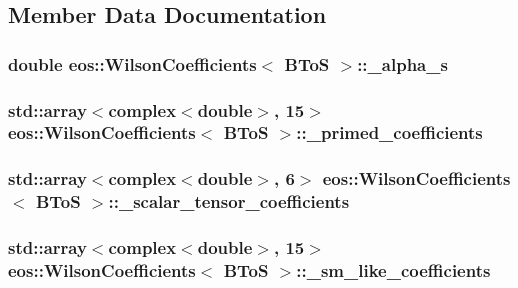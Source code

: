 \subsection{Member Data Documentation}
\hypertarget{structeos_1_1WilsonCoefficients_3_01BToS_01_4_ad988c930213682048f50ec4fa3390cc8}{
\subsubsection[{\_\-alpha\_\-s}]{\setlength{\rightskip}{0pt plus 5cm}double eos::WilsonCoefficients$<$ {\bf BToS} $>$::{\bf \_\-alpha\_\-s}}}
\label{structeos_1_1WilsonCoefficients_3_01BToS_01_4_ad988c930213682048f50ec4fa3390cc8}
\hypertarget{structeos_1_1WilsonCoefficients_3_01BToS_01_4_a4c2aa2cde65c6c77df70e6fa87736ac7}{
\subsubsection[{\_\-primed\_\-coefficients}]{\setlength{\rightskip}{0pt plus 5cm}std::array$<$complex$<$double$>$, 15$>$ eos::WilsonCoefficients$<$ {\bf BToS} $>$::{\bf \_\-primed\_\-coefficients}}}
\label{structeos_1_1WilsonCoefficients_3_01BToS_01_4_a4c2aa2cde65c6c77df70e6fa87736ac7}
\hypertarget{structeos_1_1WilsonCoefficients_3_01BToS_01_4_ac890d2d52439b631a8eaee283825dcc3}{
\subsubsection[{\_\-scalar\_\-tensor\_\-coefficients}]{\setlength{\rightskip}{0pt plus 5cm}std::array$<$complex$<$double$>$, 6$>$ eos::WilsonCoefficients$<$ {\bf BToS} $>$::{\bf \_\-scalar\_\-tensor\_\-coefficients}}}
\label{structeos_1_1WilsonCoefficients_3_01BToS_01_4_ac890d2d52439b631a8eaee283825dcc3}
\hypertarget{structeos_1_1WilsonCoefficients_3_01BToS_01_4_ad55e5edfe673a97fe71981a429cb7152}{
\subsubsection[{\_\-sm\_\-like\_\-coefficients}]{\setlength{\rightskip}{0pt plus 5cm}std::array$<$complex$<$double$>$, 15$>$ eos::WilsonCoefficients$<$ {\bf BToS} $>$::{\bf \_\-sm\_\-like\_\-coefficients}}}
